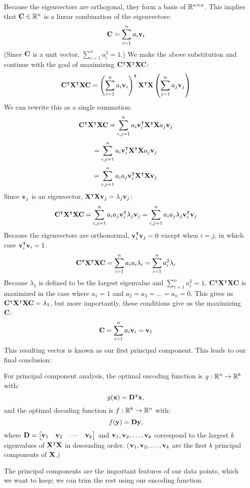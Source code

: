 Because the eigenvectors are orthogonal, they form a basis of $\R^{n \times n}$.  This implies that $\MC \in \R^n$ is a linear combination of the eigenvectors:
$$\MC = \sum^n_{i=1} a_i\vv_i$$
(Since $\MC$ is a unit vector, $\sum^n_{i=1} a^2_i = 1$.)  We make the above substitution and continue with the goal of maximizing $\MC^\intercal\MX^\intercal\MX\MC$:
$$\MC^\intercal\MX^\intercal\MX\MC = \left(\sum^n_{i=1} a_i\vv_i\right)^\intercal\MX^\intercal\MX\left(\sum^n_{j=1} a_j\vv_j\right)$$
We can rewrite this as a single summation:
$$\MC^\intercal\MX^\intercal\MX\MC = \sum^n_{i,j=1} a_i\vv^\intercal_i\MX^\intercal\MX a_j\vv_j$$
$$= \sum^n_{i,j=1} a_i\vv^\intercal_i\MX^\intercal\MX a_j\vv_j$$
$$= \sum^n_{i,j=1} a_ia_j\vv^\intercal_i\MX^\intercal\MX \vv_j$$
Since $\vv_j$ is an eigenvector, $\MX^\intercal\MX \vv_j = \lambda_j\vv_j$:
$$\MC^\intercal\MX^\intercal\MX\MC = \sum^n_{i,j=1} a_ia_j\vv^\intercal_i\lambda_j\vv_j = \sum^n_{i,j=1} a_ia_j\lambda_j\vv^\intercal_i\vv_j$$
Because the eigenvectors are orthonormal, $\vv^\intercal_i\vv_j = 0$ except when $i = j$, in which case $\vv_i^\intercal\vv_i = 1$.
$$\MC^\intercal\MX^\intercal\MX\MC = \sum^n_{i=1} a_ia_i\lambda_i = \sum^n_{i=1} a^2_i\lambda_i$$
Because $\lambda_1$ is defined to be the largest eigenvalue and $\sum^n_{i=1} a^2_i = 1$, $\MC^\intercal\MX^\intercal\MX\MC$ is maximized in the case where $a_1 = 1$ and $a_2 = a_3 = ... = a_n = 0$.  This gives us $\MC^\intercal\MX^\intercal\MX\MC = \lambda_1$, but more importantly, these conditions give us the maximizing $\MC$:
$$\MC = \sum^n_{i=1} a_i\vv_i = \vv_1$$
This resulting vector is known as our first principal component.  This leads to our final conclusion:
\begin{theorem}
    For principal component analysis, the optimal encoding function is $g : \R^n \to \R^k$ with:
    $$g(\vx) = \MD^\intercal\vx,$$
    and the optimal decoding function is $f : \R^k \to \R^n$ with:
    $$f(\vy) = \MD\vy,$$
    where $\MD = \begin{bmatrix} \vv_1 & \vv_2 & \cdots & \vv_k \end{bmatrix}$ and $\vv_1, \vv_2, \ldots, \vv_k$ correspond to the largest $k$ eigenvalues of $\MX^\intercal\MX$ in descending order.  ($\vv_1, \vv_2, \ldots, \vv_k$ are the first $k$ principal components of $\MX$.)
\end{theorem}
The principal components are the important features of our data points, which we want to keep; we can trim the rest using our encoding function.

